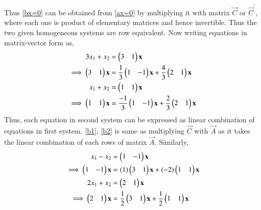 \documentclass[journal,12pt,twocolumn]{IEEEtran}
\begin{document}
Thus \eqref{bx=0} can be obtained from \eqref{ax=0} by multiplying it with matrix $\vec{C}$ or $\vec{C}^{'}$, where each one is product of elementary matrices and hence invertible. 
Thus the two given homogeneous systems are row equivalent.  
Now writing equations in matrix-vector form as, 
\begin{align}
    3x_1 + x_2 &= \begin{pmatrix}3&1\end{pmatrix}\mathbf{x} \\
    \implies \begin{pmatrix}3&1\end{pmatrix}\mathbf{x} &= \frac{1}{3}\begin{pmatrix}1&-1\end{pmatrix}\mathbf{x} + \frac{4}{3}\begin{pmatrix}2&1\end{pmatrix}\mathbf{x} \label{b1}\\
    x_1 + x_2 &= \begin{pmatrix}1&1\end{pmatrix}\mathbf{x} \\
    \implies \begin{pmatrix}1&1\end{pmatrix}\mathbf{x} &= \frac{-1}{3}\begin{pmatrix}1&-1\end{pmatrix}\mathbf{x} + 
    \frac{2}{3}\begin{pmatrix}2&1\end{pmatrix}\mathbf{x} \label{b2}
\end{align}
Thus, each equation in second system can be expressed as linear combination of equations in first system. 
\eqref{b1}, \eqref{b2} is same as multiplying $\vec{C}$ with $\vec{A}$ as it takes the linear combination of each rows of matrix $\vec{A}$. 
Similarly, 
\begin{align}
    x_1 - x_2 &= \begin{pmatrix}1&-1\end{pmatrix}\mathbf{x} \\
    \implies\begin{pmatrix}1&-1\end{pmatrix}\mathbf{x} &= (1)\begin{pmatrix}3&1\end{pmatrix}\mathbf{x} + (-2)\begin{pmatrix}1&1\end{pmatrix}\mathbf{x} \label{a1}\\
    2x_1 + x_2 &= \begin{pmatrix}2&1\end{pmatrix}\mathbf{x} \\
    \implies \begin{pmatrix}2&1\end{pmatrix}\mathbf{x} &= \frac{1}{2}\begin{pmatrix}3&1\end{pmatrix}\mathbf{x} + \frac{1}{2}\begin{pmatrix}1&1\end{pmatrix}\mathbf{x} \label{a2}
\end{align}
\end{document}
